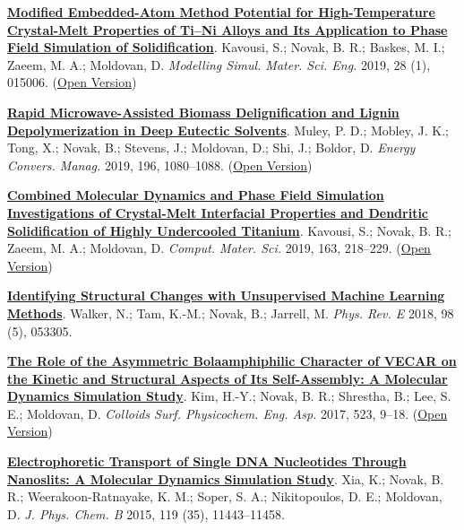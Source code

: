 \begin{cventries}
{\begin{cvitems}
        \item {\href{https://doi.org/10.1088/1361-651X/ab580c}{\textbf{Modified Embedded-Atom Method Potential for High-Temperature Crystal-Melt Properties of Ti–Ni Alloys and Its Application to Phase Field Simulation of Solidification}}. Kavousi, S.; Novak, B. R.; Baskes, M. I.; Zaeem, M. A.; Moldovan, D. \textit{Modelling Simul. Mater. Sci. Eng.} 2019, 28 (1), 015006. (\href{https://par.nsf.gov/servlets/purl/10208355}{Open Version})}
        \item {\href{https://doi.org/10.1016/j.enconman.2019.06.070}{\textbf{Rapid Microwave-Assisted Biomass Delignification and Lignin Depolymerization in Deep Eutectic Solvents}}. Muley, P. D.; Mobley, J. K.; Tong, X.; Novak, B.; Stevens, J.; Moldovan, D.; Shi, J.; Boldor, D. \textit{Energy Convers. Manag.} 2019, 196, 1080–1088. (\href{https://www.sciencedirect.com/science/article/am/pii/S0196890419307411}{Open Version})}
        \item {\href{https://doi.org/10.1016/j.commatsci.2019.03.024}{\textbf{Combined Molecular Dynamics and Phase Field Simulation Investigations of Crystal-Melt Interfacial Properties and Dendritic Solidification of Highly Undercooled Titanium}}. Kavousi, S.; Novak, B. R.; Zaeem, M. A.; Moldovan, D. \textit{Comput. Mater. Sci.} 2019, 163, 218–229. (\href{https://ipfs.io/ipfs/QmTY7FGs5p6zrExjUZ5bBpLohWdkmvvgtXZj1JuF9vV8Ay?filename=Combined_molecular_dynamics_and_phase_field_simulation_investigations_of_crystal-melt_interfacial_properties_and_dendritic_solidification_of_highly_undercooled_titanium.pdf}{Open Version})}
        \item {\href{https://doi.org/10.1103/PhysRevE.98.053305}{\textbf{Identifying Structural Changes with Unsupervised Machine Learning Methods}}. Walker, N.; Tam, K.-M.; Novak, B.; Jarrell, M. \textit{Phys. Rev. E} 2018, 98 (5), 053305.}
        \item {\href{https://doi.org/10.1016/j.colsurfa.2017.03.060}{\textbf{The Role of the Asymmetric Bolaamphiphilic Character of VECAR on the Kinetic and Structural Aspects of Its Self-Assembly: A Molecular Dynamics Simulation Study}}. Kim, H.-Y.; Novak, B. R.; Shrestha, B.; Lee, S. E.; Moldovan, D. \textit{Colloids Surf. Physicochem. Eng. Asp.} 2017, 523, 9–18. (\href{https://www.sciencedirect.com/science/article/am/pii/S0927775717303205}{Open Version})}
        \item {\href{https://doi.org/10.1021/acs.jpcb.5b02798}{\textbf{Electrophoretic Transport of Single DNA Nucleotides Through Nanoslits: A Molecular Dynamics Simulation Study}}. Xia, K.; Novak, B. R.; Weerakoon-Ratnayake, K. M.; Soper, S. A.; Nikitopoulos, D. E.; Moldovan, D. \textit{J. Phys. Chem. B} 2015, 119 (35), 11443–11458. }

\end{cvitems}}
\end{cventries}
